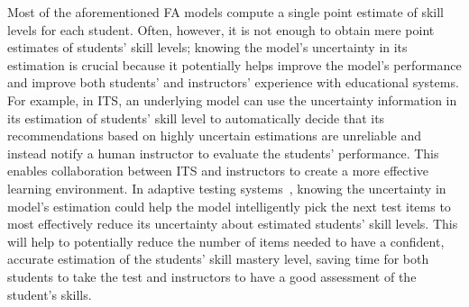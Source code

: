 \documentclass{edm_article}
\newcommand{\ml}[1]{\textcolor{orange}{\bf [LAN bandit: #1]}}
\newcommand{\jack}[1]{\textcolor{purple}{\bf [jack the ripper: #1]}}
\begin{document}
Most of the aforementioned FA models compute a single point estimate of skill levels for each student. Often, however, it is not enough to obtain mere point estimates of students' skill levels; knowing the model's uncertainty in its estimation is crucial because it potentially helps improve the model's performance and improve both students' and instructors' experience with educational systems. 
% 
For example, in ITS, an underlying model can use the uncertainty information in its estimation of students' skill level to automatically decide that its recommendations based on highly uncertain estimations are unreliable and instead notify a human instructor to evaluate the students' performance. This enables collaboration between ITS and instructors to create a more effective learning environment.
% 
In adaptive testing systems~\cite{chang2009nonlinear,yan2016computerized}, 
knowing the uncertainty in model's estimation could help the model intelligently pick the next test items to most effectively reduce its uncertainty about estimated students' skill levels. This will help to potentially reduce the number of items needed to have a confident, accurate estimation of the students' skill mastery level, saving time for both students to take the test and instructors to have a good assessment of the student's skills.
%
%
\end{document}
